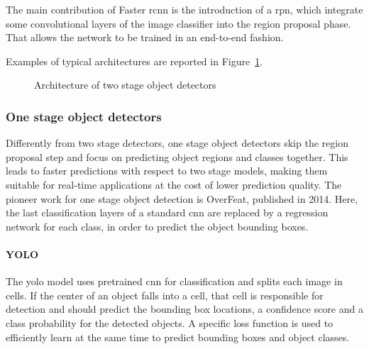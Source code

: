 \documentclass[%
    corpo=12pt,
    twoside,
    stile=classica,   
    tipotesi=magistrale,
    evenboxes,
    english,
	numerazioneromana,
]{toptesi}
\begin{document}
The main contribution of Faster \acrshort{rcnn} is the introduction of a \gls{rpn}, which integrate some convolutional layers of the image classifier into the region proposal phase. That allows the network to be trained in an end-to-end fashion.

Examples of typical architectures are reported in Figure~\ref{fig:architectures}.

\begin{figure}[ht]
	\centering
	\caption{Architecture of two stage object detectors}
	\label{fig:architectures}
\end{figure}

\subsubsection{One stage object detectors}
Differently from two stage detectors, one stage object detectors skip the region proposal step and focus on predicting object regions and classes together. This leads to faster predictions with respect to two stage models, making them suitable for real-time applications at the cost of lower prediction quality. The pioneer work for one stage object detection is OverFeat\cite{sermanet2014overfeat}, published in 2014. Here, the last classification layers of a standard \gls{cnn} are replaced by a regression network for each class, in order to predict the object bounding boxes.

\paragraph{YOLO}\label{sec:yolo}
The \acrfull{yolo} model\cite{redmon2016look} uses pretrained \gls{cnn} for classification and splits each image in cells. If the center of an object falls into a cell, that cell is responsible for detection and should predict the bounding box locations, a confidence score and a class probability for the detected objects. A specific loss function is used to efficiently learn at the same time to predict bounding boxes and object classes.
\end{document}
